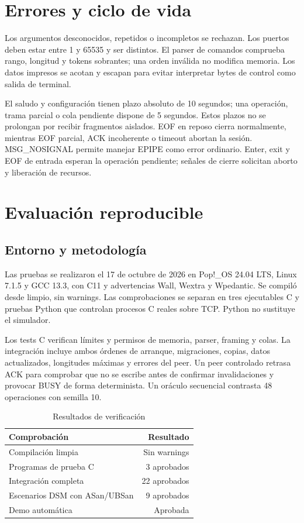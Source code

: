 \documentclass[conference]{IEEEtran}
\begin{document}
\section{Errores y ciclo de vida}
Los argumentos desconocidos, repetidos o incompletos se rechazan. Los puertos deben
estar entre 1 y 65535 y ser distintos. El parser de comandos comprueba rango, longitud
y tokens sobrantes; una orden inválida no modifica memoria. Los datos impresos se
acotan y escapan para evitar interpretar bytes de control como salida de terminal.

El saludo y configuración tienen plazo absoluto de 10 segundos; una operación, trama
parcial o cola pendiente dispone de 5 segundos. Estos plazos no se prolongan por
recibir fragmentos aislados. EOF en reposo cierra normalmente, mientras EOF parcial,
ACK incoherente o timeout abortan la sesión. MSG\_NOSIGNAL permite manejar EPIPE como
error ordinario. Enter, exit y EOF de entrada esperan la operación pendiente; señales
de cierre solicitan aborto y liberación de recursos.

\section{Evaluación reproducible}
\subsection{Entorno y metodología}
Las pruebas se realizaron el 17 de octubre de 2026 en Pop!\_OS 24.04 LTS, Linux
7.1.5 y GCC 13.3, con C11 y advertencias Wall, Wextra y Wpedantic. Se compiló desde
limpio, sin warnings. Las comprobaciones se separan en tres ejecutables C y pruebas
Python que controlan procesos C reales sobre TCP. Python no sustituye el simulador.

Los tests C verifican límites y permisos de memoria, parser, framing y colas. La
integración incluye ambos órdenes de arranque, migraciones, copias, datos actualizados,
longitudes máximas y errores del peer. Un peer controlado retrasa ACK para comprobar
que no se escribe antes de confirmar invalidaciones y provocar BUSY de forma
determinista. Un oráculo secuencial contrasta 48 operaciones con semilla 10.

\begin{table}[t]
\caption{Resultados de verificación}
\centering
\begin{tabular}{lr}
\toprule
Comprobación & Resultado\\
\midrule
Compilación limpia & Sin warnings\\
Programas de prueba C & 3 aprobados\\
Integración completa & 22 aprobados\\
Escenarios DSM con ASan/UBSan & 9 aprobados\\
Demo automática & Aprobada\\
\bottomrule
\end{tabular}
\end{table}
\end{document}
